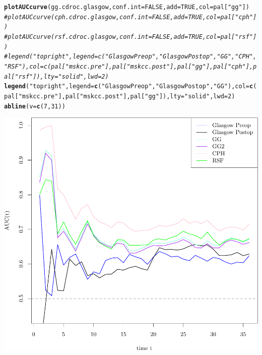 \documentclass{article}\usepackage[]{graphicx}\usepackage[]{color}
\makeatletter
\def\maxwidth{ %
  \ifdim\Gin@nat@width>\linewidth
    \linewidth
  \else
    \Gin@nat@width
  \fi
}
\newcommand{\hlnum}[1]{\textcolor[rgb]{0.686,0.059,0.569}{#1}}%
\newcommand{\hlstr}[1]{\textcolor[rgb]{0.192,0.494,0.8}{#1}}%
\newcommand{\hlcom}[1]{\textcolor[rgb]{0.678,0.584,0.686}{\textit{#1}}}%
\newcommand{\hlstd}[1]{\textcolor[rgb]{0.345,0.345,0.345}{#1}}%
\newcommand{\hlkwc}[1]{\textcolor[rgb]{0.333,0.667,0.333}{#1}}%
\newcommand{\hlkwd}[1]{\textcolor[rgb]{0.737,0.353,0.396}{\textbf{#1}}}%
\newenvironment{kframe}{%
 \def\at@end@of@kframe{}%
 \ifinner\ifhmode%
  \def\at@end@of@kframe{\end{minipage}}%
  \begin{minipage}{\columnwidth}%
 \fi\fi%
 \def\FrameCommand##1{\hskip\@totalleftmargin \hskip-\fboxsep
 \colorbox{shadecolor}{##1}\hskip-\fboxsep
     \hskip-\linewidth \hskip-\@totalleftmargin \hskip\columnwidth}%
 \MakeFramed {\advance\hsize-\width
   \@totalleftmargin\z@ \linewidth\hsize
   \@setminipage}}%
 {\par\unskip\endMakeFramed%
 \at@end@of@kframe}
\newenvironment{knitrout}{}{} %
\makeatother
\begin{document}
\begin{knitrout}
\begin{kframe}
\begin{alltt}
\hlkwd{plotAUCcurve}\hlstd{(gg.cdroc.glasgow,} \hlkwc{conf.int} \hlstd{=} \hlnum{FALSE}\hlstd{,} \hlkwc{add} \hlstd{=} \hlnum{TRUE}\hlstd{,} \hlkwc{col} \hlstd{= pal[}\hlstr{"gg"}\hlstd{])}
\hlcom{# plotAUCcurve(cph.cdroc.glasgow, conf.int = FALSE, add = TRUE, col = pal["cph"])}
\hlcom{# plotAUCcurve(rsf.cdroc.glasgow, conf.int = FALSE, add = TRUE, col = pal["rsf"])}
\hlcom{# legend("topright", legend = c("Glasgow Preop", "Glasgow Postop", "GG", "CPH", "RSF"), col = c(pal["mskcc.pre"], pal["mskcc.post"], pal["gg"], pal["cph"], pal["rsf"]), lty = "solid", lwd = 2)}
\hlkwd{legend}\hlstd{(}\hlstr{"topright"}\hlstd{,} \hlkwc{legend} \hlstd{=} \hlkwd{c}\hlstd{(}\hlstr{"Glasgow Preop"}\hlstd{,} \hlstr{"Glasgow Postop"}\hlstd{,} \hlstr{"GG"}\hlstd{),} \hlkwc{col} \hlstd{=} \hlkwd{c}\hlstd{(pal[}\hlstr{"mskcc.pre"}\hlstd{], pal[}\hlstr{"mskcc.post"}\hlstd{], pal[}\hlstr{"gg"}\hlstd{]),} \hlkwc{lty} \hlstd{=} \hlstr{"solid"}\hlstd{,} \hlkwc{lwd} \hlstd{=} \hlnum{2}\hlstd{)}
\hlkwd{abline}\hlstd{(}\hlkwc{v} \hlstd{=} \hlkwd{c}\hlstd{(}\hlnum{7}\hlstd{,} \hlnum{31}\hlstd{))}
\end{alltt}
\end{kframe}

{\centering \includegraphics[width=\maxwidth]{figure/05-timeROC-1} 

}



\end{knitrout}
\end{document}
